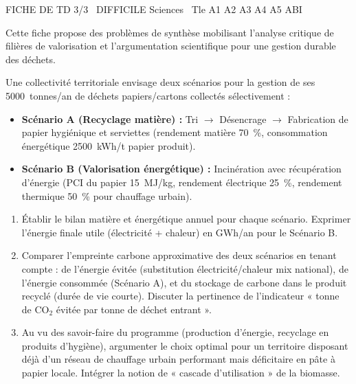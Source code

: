 \documentclass[11pt]{article}
\begin{document}
\begin{tcolorbox}[enhanced,colback=popink,colframe=popink,arc=10pt,boxrule=0pt,left=12pt,right=12pt,top=9pt,bottom=9pt]
{\color{white}\popxbold\small FICHE DE TD 3/3 \textbullet\ DIFFICILE \hfill Sciences \textbullet\ Tle A1 A2 A3 A4 A5 ABI\par}
\end{tcolorbox}
\vspace{4pt}
Cette fiche propose des problèmes de synthèse mobilisant l'analyse critique de filières de valorisation et l'argumentation scientifique pour une gestion durable des déchets.

\begin{exercice}
Une collectivité territoriale envisage deux scénarios pour la gestion de ses \SI{5000}{tonnes/an} de déchets papiers/cartons collectés sélectivement :
\begin{itemize}
    \item \textbf{Scénario A (Recyclage matière) :} Tri $\rightarrow$ Désencrage $\rightarrow$ Fabrication de papier hygiénique et serviettes (rendement matière \SI{70}{\%}, consommation énergétique \SI{2500}{kWh/t} papier produit).
    \item \textbf{Scénario B (Valorisation énergétique) :} Incinération avec récupération d'énergie (PCI du papier \SI{15}{MJ/kg}, rendement électrique \SI{25}{\%}, rendement thermique \SI{50}{\%} pour chauffage urbain).
\end{itemize}
\begin{enumerate}
    \item Établir le bilan matière et énergétique annuel pour chaque scénario. Exprimer l'énergie finale utile (électricité + chaleur) en GWh/an pour le Scénario B.
    \item Comparer l'empreinte carbone approximative des deux scénarios en tenant compte : de l'énergie évitée (substitution électricité/chaleur mix national), de l'énergie consommée (Scénario A), et du stockage de carbone dans le produit recyclé (durée de vie courte). Discuter la pertinence de l'indicateur « tonne de CO$_2$ évitée par tonne de déchet entrant ».
    \item Au vu des savoir-faire du programme (production d'énergie, recyclage en produits d'hygiène), argumenter le choix optimal pour un territoire disposant déjà d'un réseau de chauffage urbain performant mais déficitaire en pâte à papier locale. Intégrer la notion de « cascade d'utilisation » de la biomasse.
\end{enumerate}
\end{exercice}
\end{document}
